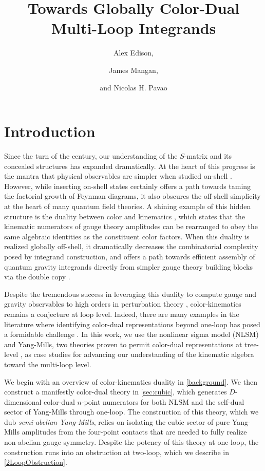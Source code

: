 \documentclass[11pt,letter]{article}
\author{\large Alex Edison,}
\author{\large James Mangan,}
\author{\large and Nicolas H. Pavao}
\affiliation{Department of Physics and Astronomy, Northwestern
  University, Evanston, Illinois 60208, USA}
\title{\center  \fontsize{18.8}{20} \selectfont  Towards Globally Color-Dual Multi-Loop Integrands}
\begin{document}
\maketitle
\flushbottom
 

\section{Introduction}\label{intro}
Since the turn of the century, our understanding of the $S$-matrix and
its concealed structures has expanded dramatically. At the heart of this
progress is the mantra that physical observables are simpler when
studied on-shell
\cite{Parke:1986gb,TasiLance,Cheung:2017pzi}. However, while inserting on-shell states certainly offers a path towards taming the
factorial growth of Feynman diagrams, it also obscures the off-shell
simplicity at the heart of many quantum field theories. A shining
example of this hidden structure is the duality between color and
kinematics \cite{BCJ,Bern:2010ue,BCJreview}, which states that the
kinematic numerators of gauge theory amplitudes can be rearranged to
obey the same algebraic identities as the constituent color
factors. When this duality is realized globally off-shell, it
dramatically decreases the combinatorial complexity posed by integrand
construction, and offers a path towards efficient assembly of quantum
gravity integrands directly from simpler gauge theory building blocks
via the double copy \cite{BCJ,Bern:2010ue}.

Despite the tremendous success in leveraging this duality to
compute gauge and gravity observables to high orders in perturbation
theory \cite{FiveLoopN4, GeneralizedDoubleCopyFiveLoops, Bern:2018jmv,
  Carrasco:2021otn}, color-kinematics remains a conjecture at loop
level. Indeed, there are many examples in the literature where
identifying color-dual representations beyond one-loop has posed a
formidable challenge
\cite{Mogull:2015adi, Johansson:2017bfl, KalinN2TwoLoop, Bern:2015ooa}. In this work, we use
the nonlinear sigma model (NLSM) and Yang-Mills, two theories proven
to permit color-dual representations at tree-level
\cite{Feng:2010my,Cachazo:2014xea}, as case studies for advancing our
understanding of the kinematic algebra toward the multi-loop level.

We begin with an overview of color-kinematics duality in
\cref{background}. We then construct a manifestly color-dual theory in
\cref{sec:cubic}, which generates $D$-dimensional color-dual $n$-point
numerators for both NLSM and the self-dual sector of Yang-Mills
through one-loop. The construction of this theory, which we dub
\textit{semi-abelian Yang-Mills}, relies on isolating the cubic sector
of pure Yang-Mills amplitudes from the four-point contacts that are
needed to fully realize non-abelian gauge symmetry. Despite the
potency of this theory at one-loop, the construction runs into an
obstruction at two-loop, which we describe in \cref{2LoopObstruction}.
\end{document}
